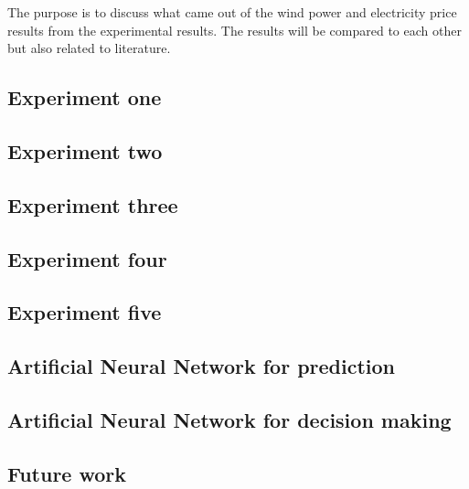 The purpose is to discuss what came out of the wind power and electricity price results from the experimental results. The results will be compared to each other but also related to literature.

\subsection{Experiment one}
\label{sec:inputParameterDiscussion}


\subsection{Experiment two}


\subsection{Experiment three}


\subsection{Experiment four}


\subsection{Experiment five}
\label{sec:stepAheadForecastingDiscussion}


\subsection{Artificial Neural Network for prediction}


\subsection{Artificial Neural Network for decision making}

\subsection{Future work}


